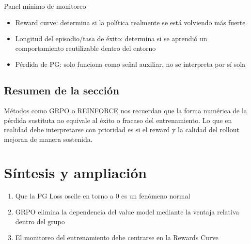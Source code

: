 \documentclass[a4paper]{article}
\begin{document}
\begin{knowledgebox}{Panel mínimo de monitoreo}
\begin{itemize}
  \item Reward curve: determina si la política realmente se está volviendo más fuerte
  \item Longitud del episodio/tasa de éxito: determina si se aprendió un comportamiento reutilizable dentro del entorno
  \item Pérdida de PG: solo funciona como señal auxiliar, no se interpreta por sí sola
\end{itemize}
\end{knowledgebox}

\subsection{Resumen de la sección}
Métodos como GRPO o REINFORCE nos recuerdan que la forma numérica de la pérdida sustituta no equivale al éxito o fracaso del entrenamiento. Lo que en realidad debe interpretarse con prioridad es si el reward y la calidad del rollout mejoran de manera sostenida.

\newpage
\section{Síntesis y ampliación}
\begin{enumerate}
  \item Que la PG Loss oscile en torno a 0 es un fenómeno normal
  \item GRPO elimina la dependencia del value model mediante la ventaja relativa dentro del grupo
  \item El monitoreo del entrenamiento debe centrarse en la Rewards Curve
\end{enumerate}
\end{document}

